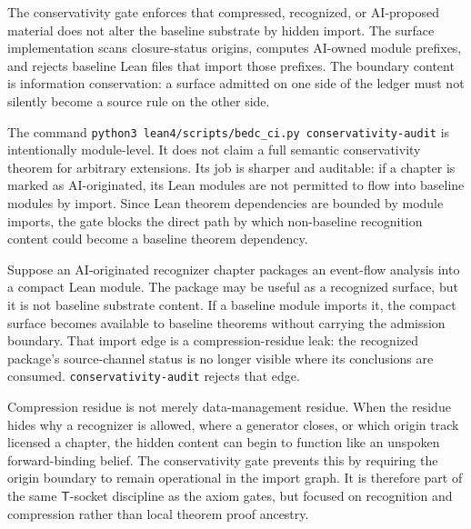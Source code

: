 \begin{principle}
\label{prin:audit-gates-conservativity-information}
The conservativity gate enforces that compressed, recognized, or AI-proposed material does not alter the baseline substrate by hidden import. The surface implementation scans closure-status origins, computes AI-owned module prefixes, and rejects baseline Lean files that import those prefixes. The boundary content is information conservation: a surface admitted on one side of the ledger must not silently become a source rule on the other side.
\end{principle}

The command \texttt{python3 lean4/scripts/bedc\_ci.py conservativity-audit} is intentionally module-level. It does not claim a full semantic conservativity theorem for arbitrary extensions. Its job is sharper and auditable: if a chapter is marked as AI-originated, its Lean modules are not permitted to flow into baseline modules by import. Since Lean theorem dependencies are bounded by module imports, the gate blocks the direct path by which non-baseline recognition content could become a baseline theorem dependency.

\begin{example}
\label{ex:audit-gates-baseline-import-hidden-compression}
Suppose an AI-originated recognizer chapter packages an event-flow analysis into a compact Lean module. The package may be useful as a recognized surface, but it is not baseline substrate content. If a baseline module imports it, the compact surface becomes available to baseline theorems without carrying the admission boundary. That import edge is a compression-residue leak: the recognized package's source-channel status is no longer visible where its conclusions are consumed. \texttt{conservativity-audit} rejects that edge.
\end{example}

\begin{remark}
\label{rem:audit-gates-conservativity-transcendental}
Compression residue is not merely data-management residue. When the residue hides why a recognizer is allowed, where a generator closes, or which origin track licensed a chapter, the hidden content can begin to function like an unspoken forward-binding belief. The conservativity gate prevents this by requiring the origin boundary to remain operational in the import graph. It is therefore part of the same $\mathsf{T}$-socket discipline as the axiom gates, but focused on recognition and compression rather than local theorem proof ancestry.
\end{remark}


